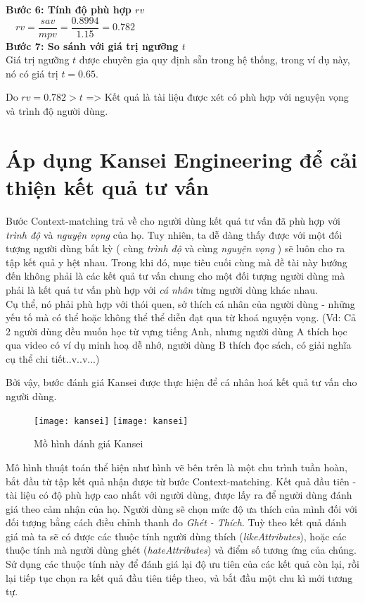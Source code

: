 \textbf{Bước 6: Tính độ phù hợp $rv$}\\

$\>$$\>$$\>$ $rv = \dfrac{sav}{mpv} = \dfrac{0.8994}{1.15} = 0.782 $\\

\textbf{Bước 7: So sánh với giá trị ngưỡng $t$}\\

Giá trị ngưỡng $t$ được chuyên gia quy định sẵn trong hệ thống, trong ví dụ này, nó có giá trị $t = 0.65$.

Do $rv = 0.782 > t$ => Kết quả là tài liệu được xét có phù hợp với nguyện vọng và trình độ người dùng.
	
\section{Áp dụng Kansei Engineering để cải thiện kết quả tư vấn}

Bước Context-matching trả về cho người dùng kết quả tư vấn đã phù hợp với \textit{trình độ} và \textit{nguyện vọng} của họ. Tuy nhiên, ta dễ dàng thấy được với một đối tượng người dùng bất kỳ ( cùng \textit{trình độ} và cùng \textit{nguyện vọng} ) sẽ luôn cho ra tập kết quả y hệt nhau. Trong khi đó, mục tiêu cuối cùng mà đề tài này hướng đến không phải là các kết quả tư vấn chung cho một đối tượng người dùng mà phải là kết quả tư vấn phù hợp với \textit{cá nhân} từng người dùng khác nhau.\\

 Cụ thể, nó phải phù hợp với thói quen, sở thích cá nhân của người dùng - những yếu tố mà có thể hoặc không thể thể diễn đạt qua từ khoá nguyện vọng. (Vd: Cả 2 người dùng đều muốn học từ vựng tiếng Anh, nhưng người dùng A thích học qua video có ví dụ minh hoạ dễ nhớ, người dùng B thích đọc sách, có giải nghĩa cụ thể chi tiết..v..v...)

 Bởi vậy, bước đánh giá Kansei được thực hiện để cá nhân hoá kết quả tư vấn cho người dùng.

\begin{figure}[H]
  \begin{center}
    \ifpdf
      \texttt{[image: kansei]}
    \else
      \texttt{[image: kansei]}
    \fi
    \caption{Mồ hình đánh giá Kansei}
    \label{KanseiModel}
  \end{center}
\end{figure}

Mô hình thuật toán thể hiện như hình vẽ bên trên là một chu trình tuần hoàn, bắt đầu từ tập kết quả nhận được từ bước Context-matching. Kết quả đầu tiên - tài liệu có độ phù hợp cao nhất với người dùng, được lấy ra để người dùng đánh giá theo cảm nhận của họ. Người dùng sẽ chọn mức độ ưa thích của mình đối với đối tượng bằng cách điều chỉnh thanh đo \textit{Ghét - Thích}. Tuỳ theo kết quả đánh giá mà ta sẽ có được các thuộc tính người dùng thích (\textit{likeAttributes}), hoặc các thuộc tính mà người dùng ghét (\textit{hateAttributes}) và điểm số tương ứng của chúng. Sử dụng các thuộc tính này để đánh giá lại độ ưu tiên của các kết quả còn lại, rồi lại tiếp tục chọn ra kết quả đầu tiên tiếp theo, và bắt đầu một chu kì mới tương tự. 


